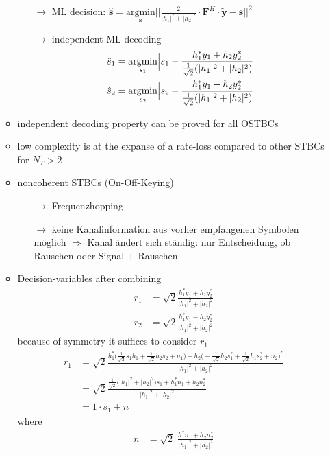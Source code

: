 \documentclass[a4paper, 10pt]{article}
\begin{document}
\begin{itemize}
\begin{itemize}
\begin{itemize}
			\item[$\rightarrow$] ML decision: $\hat{\textbf{s}} = \underset{\textbf{s}}{\text{argmin}}\bigl | \bigl | \frac{2}{|h_1|^2 + |h_2|^2}\cdot \textbf{F}^H\cdot \tilde{\textbf{y}} - \textbf{s}\bigr |\bigr |^2 $
			\item[$\rightarrow$] independent ML decoding 
				\begin{align*}
					\hat{s}_1 &= \underset{s_1}{\text{argmin}} \Bigl |s_1 - \frac{h_1^*y_1 + h_2y_2^*}{\frac{1}{\sqrt{2}}(|h_1|^2 + |h_2|^2)}\Bigr |\\ \hat{s}_2 & = \underset{s_2}{\text{argmin}}\Bigl |s_2 - \frac{h_1^*y_1 - h_2y_2^*}{\frac{1}{\sqrt{2}}(|h_1|^2 + |h_2|^2)}\Bigr|
				\end{align*}
		\end{itemize}
		\item independent decoding property can be proved for all OSTBCs
		\item low complexity is at the expanse of a rate-loss compared to other STBCs for $N_T > 2$
		\item noncoherent STBCs (On-Off-Keying)
		\begin{itemize}
			\item[$\rightarrow$] Frequenzhopping
			\item[$\rightarrow$] keine Kanalinformation aus vorher empfangenen Symbolen m\"oglich $\Rightarrow$ Kanal \"andert sich st\"andig: nur Entscheidung, ob Rauschen oder Signal $+$ Rauschen	
		\end{itemize}
		\item Decision-variables after combining
		\begin{align*}
			r_1 &= \sqrt{2}\frac{h_1^*y_1 + h_2y_2^*}{|h_1|^2 + |h_2|^2}\\
			r_2 &= \sqrt{2}\frac{h_1^*y_1 - h_2y_2^*}{|h_1|^2 + |h_2|^2}
\end{align*} 
because of symmetry it suffices to consider $r_1$
		\begin{align*}
			r_1 &= \sqrt{2}\frac{h_1^*\bigl(\frac{1}{\sqrt{2}}s_1h_1 + \frac{1}{\sqrt{2}}h_2s_2 + n_1 \bigr) + h_2\bigl(-\frac{1}{\sqrt{2}}h_2s_1^* + \frac{1}{\sqrt{2}}h_1s_2^* + n_2\bigr)^*}{|h_1|^2 + |h_2|^2}\\ 
			&= \sqrt{2}\frac{\frac{1}{\sqrt2} \bigl(|h_1|^2 + |h_2|^2\bigr) s_1 + h_1^*n_1 + h_2n_2^*} {|h_1|^2 + |h_2|^2}\\
			&= 1\cdot s_1 + n
		\end{align*}
		where 
		\begin{align*}
			n &= \sqrt{2}\;\frac{h_1^*n_1 + h_2n_2^*}{|h_1|^2 + |h_2|^2}\\

\end{align*}
\end{itemize}
\end{itemize}
\end{document}
